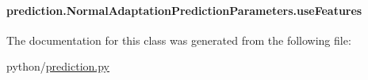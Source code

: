 \hypertarget{classprediction_1_1NormalAdaptationPredictionParameters_aa8f623907e9b858e119f5675f988e5ea}{
\paragraph[{use\-Features}]{\setlength{\rightskip}{0pt plus 5cm}prediction.\-Normal\-Adaptation\-Prediction\-Parameters.\-use\-Features}}\label{classprediction_1_1NormalAdaptationPredictionParameters_aa8f623907e9b858e119f5675f988e5ea}


The documentation for this class was generated from the following file\-:\begin{DoxyCompactItemize}
\item 
python/\hyperlink{prediction_8py}{prediction.\-py}\end{DoxyCompactItemize}

